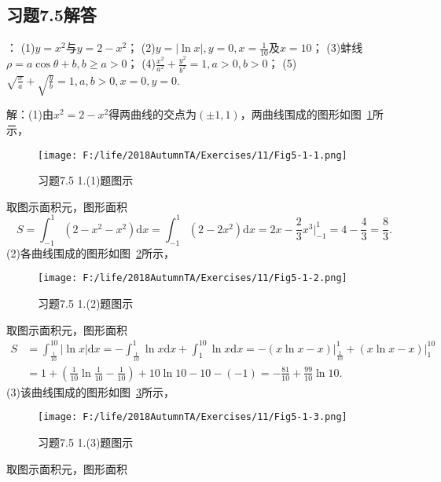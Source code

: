 \documentclass[12pt,UTF8]{ctexart}
\begin{document}
\subsection{习题7.5解答}
\begin{enumerate}
：
\newline
(1)$y=x^2$与$y=2-x^2$；
\newline
(2)$y=|\ln x|,y=0,x=\frac1{10}$及$x=10$；
\newline
(3)蚌线$\rho=a\cos\theta+b,b\geq a>0$；
\newline
(4)$\frac{x^2}{a^2}+\frac{y^2}{b^2}=1,a>0,b>0$；
\newline
(5)$\sqrt{\frac xa}+\sqrt{\frac yb}=1,a,b>0,x=0,y=0$.

解：(1)由$x^2=2-x^2$得两曲线的交点为$(\pm1,1)$，两曲线围成的图形如图~\ref{5-1-1}所示，
\begin{figure}[H]
\begin{center}
\texttt{[image: F:/life/2018AutumnTA/Exercises/11/Fig5-1-1.png]}
\end{center}
\caption{习题7.5 1.(1)题图示}
\label{5-1-1}
\end{figure}
取图示面积元，图形面积
\[S=\int_{-1}^1(2-x^2-x^2)\mathrm dx=\int_{-1}^1(2-2x^2)\mathrm dx=2x-\frac23x^3\Big|_{-1}^1=4-\frac43=\frac83.\]
(2)各曲线围成的图形如图~\ref{5-1-2}所示，
\begin{figure}[H]
\begin{center}
\texttt{[image: F:/life/2018AutumnTA/Exercises/11/Fig5-1-2.png]}
\end{center}
\caption{习题7.5 1.(2)题图示}
\label{5-1-2}
\end{figure}
取图示面积元，图形面积
\[\begin{split}
S&=\int_{\frac1{10}}^{10}|\ln x|\mathrm dx=-\int_{\frac1{10}}^1\ln x\mathrm dx+\int_1^{10}\ln x\mathrm dx=-(x\ln x-x)\Big|_{\frac1{10}}^1+(x\ln x-x)\Big|_1^{10}\\
&=1+(\frac1{10}\ln\frac1{10}-\frac1{10})+10\ln10-10-(-1)=-\frac{81}{10}+\frac{99}{10}\ln10.
\end{split}\]
(3)该曲线围成的图形如图~\ref{5-1-3}所示，
\begin{figure}[H]
\begin{center}
\texttt{[image: F:/life/2018AutumnTA/Exercises/11/Fig5-1-3.png]}
\end{center}
\caption{习题7.5 1.(3)题图示}
\label{5-1-3}
\end{figure}
取图示面积元，图形面积
\[\begin{split}

\end{split}\]
\end{enumerate}
\end{document}
